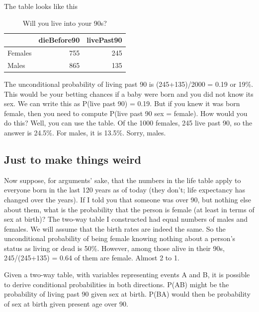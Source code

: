 \documentclass[openany]{book}
\begin{document}
The table looks like this

\begin{table}[!h]

\caption{\label{tab:unnamed-chunk-19}Will you live into your 90s?}
\centering
\begin{tabular}[t]{lrr}
\toprule
  & dieBefore90 & livePast90\\
\midrule
Females & 755 & 245\\
Males & 865 & 135\\
\bottomrule
\end{tabular}
\end{table}

The unconditional probability of living past 90 is (245+135)/2000 = 0.19 or 19\%. This would be your betting chances if a baby were born and you did not know its sex. We can write this as P(live past 90) = 0.19. But if you knew it was born female, then you need to compute P(live past 90 \textbar{} sex = female). How would you do this? Well, you can use the table. Of the 1000 females, 245 live past 90, so the answer is 24.5\%. For males, it is 13.5\%. Sorry, males.

\hypertarget{just-to-make-things-weird}{%
\subsection*{Just to make things weird}\label{just-to-make-things-weird}}

Now suppose, for arguments' sake, that the numbers in the life table apply to everyone born in the last 120 years as of today (they don't; life expectancy has changed over the years). If I told you that someone was over 90, but nothing else about them, what is the probability that the person is female (at least in terms of sex at birth)? The two-way table I constructed had equal numbers of males and females. We will assume that the birth rates are indeed the same. So the unconditional probability of being female knowing nothing about a person's status as living or dead is 50\%. However, among those alive in their 90s, 245/(245+135) = 0.64 of them are female. Almost 2 to 1.

Given a two-way table, with variables representing events A and B, it is possible to derive conditional probabilities in both directions. P(A\textbar{}B) might be the probability of living past 90 given sex at birth. P(B\textbar{}A) would then be probability of sex at birth given present age over 90.
\end{document}
